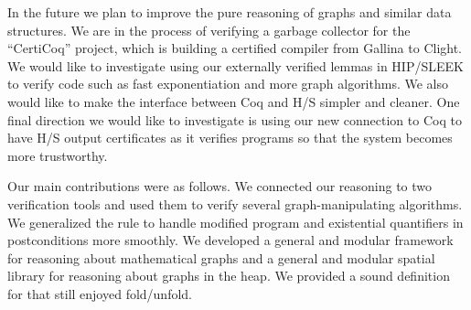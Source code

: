 In the future we plan to improve the pure reasoning of graphs and
similar data structures.  We are in the process of verifying a garbage
collector for the ``CertiCoq'' project, which is building
a certified compiler from Gallina to Clight. We would like to investigate
using our externally verified lemmas in HIP/SLEEK to verify code such as fast
exponentiation and more graph algorithms. We also would like to make
the interface between Coq and H/S simpler and cleaner.
One final direction we would like to investigate is using our new
connection to Coq to have H/S output certificates as it
verifies programs so that the system becomes more trustworthy.

Our main contributions were as follows.  We connected our reasoning
to two verification tools and used them to verify several graph-manipulating algorithms.
We generalized the 
rule to handle modified program and existential quantifiers in postconditions
more smoothly.  We developed a general and modular framework for reasoning
about mathematical graphs and a general and modular spatial library for
reasoning about graphs in the heap.  We provided a sound definition for 
that still enjoyed fold/unfold.
